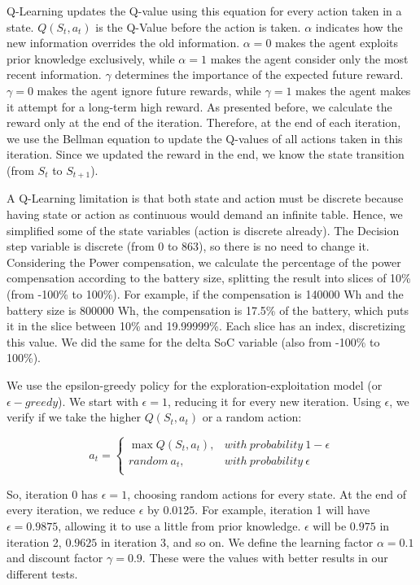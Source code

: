 Q-Learning updates the Q-value using this equation for every action taken in a state. $Q(S_t, a_t)$ is the Q-Value before the action is taken. $\alpha$ indicates how the new information overrides the old information. $\alpha = 0$ makes the agent exploits prior knowledge exclusively, while $\alpha = 1$ makes the agent consider only the most recent information. $\gamma$ determines the importance of the expected future reward. $\gamma = 0$ makes the agent ignore future rewards, while $\gamma = 1$ makes the agent makes it attempt for a long-term high reward. As presented before, we calculate the reward only at the end of the iteration. Therefore, at the end of each iteration, we use the Bellman equation to update the Q-values of all actions taken in this iteration. Since we updated the reward in the end, we know the state transition (from $S_{t}$ to $S_{t+1}$).

A Q-Learning limitation is that both state and action must be discrete because having state or action as continuous would demand an infinite table. Hence, we simplified some of the state variables (action is discrete already). The Decision step variable is discrete (from 0 to 863), so there is no need to change it. Considering the Power compensation, we calculate the percentage of the power compensation according to the battery size, splitting the result into slices of 10\% (from -100\% to 100\%). For example, if the compensation is 140000 Wh and the battery size is 800000 Wh, the compensation is 17.5\% of the battery, which puts it in the slice between 10\% and 19.99999\%. Each slice has an index, discretizing this value. We did the same for the delta SoC variable (also from -100\% to 100\%).

We use the epsilon-greedy policy for the exploration-exploitation model (or $\epsilon-greedy$). We start with $\epsilon = 1$, reducing it for every new iteration. Using $\epsilon$, we verify if we take the higher $Q(S_t, a_t)$ or a random action:

\begin{equation}
    a_t = \begin{cases}
        \max Q(S_t, a_t), & with\ probability\ 1 - \epsilon \\
        random\ a_t, & with\ probability\ \epsilon \\
    \end{cases}
\end{equation}

So, iteration 0 has $\epsilon = 1$, choosing random actions for every state. At the end of every iteration, we reduce $\epsilon$ by $0.0125$. For example, iteration 1 will have $\epsilon = 0.9875$, allowing it to use a little from prior knowledge. $\epsilon$ will be $0.975$ in iteration 2, $0.9625$ in iteration 3, and so on. We define the learning factor $\alpha = 0.1$ and discount factor $\gamma = 0.9$. These were the values with better results in our different tests.

